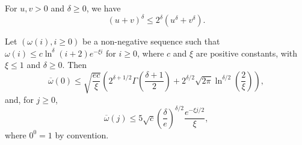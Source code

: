 \documentclass[10pt,a4paper]{amsart}
\begin{document}
\begin{proposition}\label{pr:MomentInequality}For \(u,v>0\) and \(\delta\geq0\), we have\begin{equation*}
(u+v)^{\delta}\leq2^{\delta}(u^{\delta}+v^{\delta}).
\end{equation*} 
\end{proposition}

\begin{proposition}\label{pr:exponentialDecay}Let \((\omega(i),i\geq0)\) be  a non-negative sequence such that \(\omega(i)\le c\ln^{\delta}(i+2) e^{-\xi i}\) for \(i\geq0\), where  \(c\) and \(\xi\) are positive constants, with \(\xi\leq1\) and \(\delta\ge0\). Then \begin{equation}\label{eq:S0upperBoundGen}
\overline{\omega}(0)\leq \sqrt{\frac{ec}{\xi}}\left(2^{\delta+1/2}\Gamma(\frac{\delta+1}{2})+2^{\delta/2}\sqrt{2\pi}\ln^{\delta/2}(\frac{2}{\xi})\right),
\end{equation}and, for \(j\geq 0\),
\begin{equation}\label{eq:SjUpperBoundGeom}
\overline{\omega}(j)\le5\sqrt{c}{\left(\frac{\delta}{e}\right)}^{\delta/2}\frac{e^{-\xi j/2}}{\xi},
\end{equation}
where \(0^{0}=1\) by convention.
\end{proposition}
\end{document}
